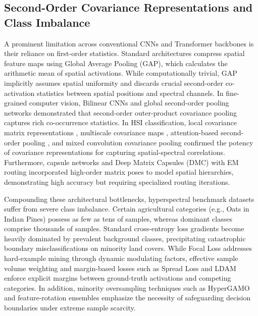 \documentclass[manuscript,screen,review]{acmart}
\begin{document}
\subsection{Second-Order Covariance Representations and Class Imbalance}
A prominent limitation across conventional CNNs and Transformer backbones is their reliance on first-order statistics. Standard architectures compress spatial feature maps using Global Average Pooling (GAP), which calculates the arithmetic mean of spatial activations. While computationally trivial, GAP implicitly assumes spatial uniformity and discards crucial second-order co-activation statistics between spatial positions and spectral channels. In fine-grained computer vision, Bilinear CNNs \cite{lin2015bilinear} and global second-order pooling networks \cite{gao2019global, li2018towards} demonstrated that second-order outer-product covariance pooling captures rich co-occurrence statistics. In HSI classification, local covariance matrix representations \cite{fang2018new}, multiscale covariance maps \cite{he2019feature}, attention-based second-order pooling \cite{xue2021attention}, and mixed convolution covariance pooling \cite{zheng2021hyperspectral} confirmed the potency of covariance representations for capturing spatial-spectral correlations. Furthermore, capsule networks \cite{paoletti2018capsule} and Deep Matrix Capsules (DMC) with EM routing \cite{wang2021deep} incorporated high-order matrix poses to model spatial hierarchies, demonstrating high accuracy but requiring specialized routing iterations.

Compounding these architectural bottlenecks, hyperspectral benchmark datasets suffer from severe class imbalance. Certain agricultural categories (e.g., Oats in Indian Pines) possess as few as tens of samples, whereas dominant classes comprise thousands of samples. Standard cross-entropy loss gradients become heavily dominated by prevalent background classes, precipitating catastrophic boundary misclassifications on minority land covers. While Focal Loss \cite{lin2017focal} addresses hard-example mining through dynamic modulating factors, effective sample volume weighting \cite{cui2019class} and margin-based losses such as Spread Loss \cite{sabour2018matrix} and LDAM \cite{cao2019learning} enforce explicit margins between ground-truth activations and competing categories. In addition, minority oversampling techniques such as HyperGAMO \cite{haut2021generative} and feature-rotation ensembles \cite{su2023spectral} emphasize the necessity of safeguarding decision boundaries under extreme sample scarcity.
\end{document}
